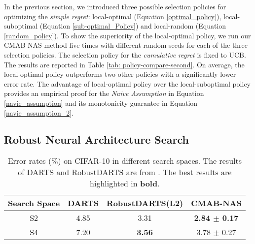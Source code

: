 \documentclass[conference]{IEEEtran}
\begin{document}
In the previous section, we introduced three possible selection policies for optimizing the \emph{simple regret}: local-optimal (Equation \eqref{optimal_policy}), local-suboptimal (Equation \eqref{sub-optimal_Policy}) and local-random (Equation \eqref{random_policy}).
To show the superiority of the local-optimal policy, we run our CMAB-NAS method five times with different random seeds for each of the three selection policies. The selection policy for the \emph{cumulative regret} is fixed to UCB. The results are reported in Table \ref{tab: policy-compare-second}. On average, the local-optimal policy outperforms two other policies with a significantly lower error rate. The advantage of local-optimal policy over the local-suboptimal policy provides an empirical proof for the \emph{Naive Assumption} in Equation \eqref{navie_assumption} and its monotonicity guarantee in Equation \eqref{navie_assumption_2}. 


\subsection{Robust Neural Architecture Search}
\begin{table}[h]
\centering
\caption{Error rates (\%) on CIFAR-10 in different search spaces. The results of DARTS and RobustDARTS are from \cite{DBLP:conf/iclr/ZelaESMBH20}. The best results are highlighted in \textbf{bold}.}
\label{tab:robust_search}
\begin{adjustbox}{max width=\linewidth}
\begin{tabular}{c|ccc}\hline
\textbf{Search Space}  & \textbf{DARTS} & \textbf{RobustDARTS(L2)} & \textbf{CMAB-NAS}        \\ \hline \hline
 S2  &  4.85 & 3.31  & \textbf{2.84 $\pm$ 0.17} \\
 S4  & 7.20 &   \textbf{3.56} & 3.78 $\pm$ 0.27     \\  \hline
\end{tabular}
\end{adjustbox}
\end{table}
\end{document}
